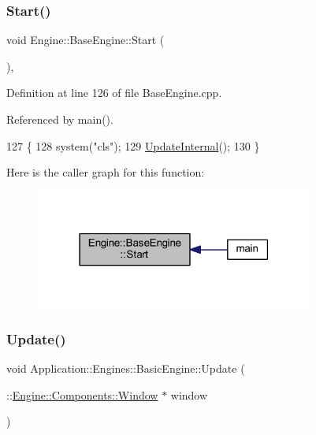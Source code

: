 \subsubsection{\texorpdfstring{Start()}{Start()}}
{\footnotesize\ttfamily void Engine\+::\+Base\+Engine\+::\+Start (\begin{DoxyParamCaption}{ }\end{DoxyParamCaption})\hspace{0.3cm}{\ttfamily [virtual]}, {\ttfamily [inherited]}}



Definition at line 126 of file Base\+Engine.\+cpp.



Referenced by main().


\begin{DoxyCode}
127 \{
128     system(\textcolor{stringliteral}{"cls"});
129     \mbox{\hyperlink{classEngine_1_1BaseEngine_aad3c237ca657b9f22f76fccf7fc7561f}{UpdateInternal}}();
130 \}
\end{DoxyCode}
Here is the caller graph for this function\+:
\nopagebreak
\begin{figure}[H]
\begin{center}
\leavevmode
\includegraphics[width=259pt]{classEngine_1_1BaseEngine_a525fdc7a1da7eecb514ad5763f06be79_icgraph}
\end{center}
\end{figure}
\mbox{\label{classApplication_1_1Engines_1_1BasicEngine_ad628d9878f5008dd7f7f7743a75d5f17}} 
\subsubsection{\texorpdfstring{Update()}{Update()}\hspace{0.1cm}{\footnotesize\ttfamily [1/2]}}
{\footnotesize\ttfamily void Application\+::\+Engines\+::\+Basic\+Engine\+::\+Update (\begin{DoxyParamCaption}\item[{\+::\mbox{\hyperlink{classEngine_1_1Components_1_1Window}{Engine\+::\+Components\+::\+Window}} $\ast$}]{window }\end{DoxyParamCaption})\hspace{0.3cm}{\ttfamily [override]}}



